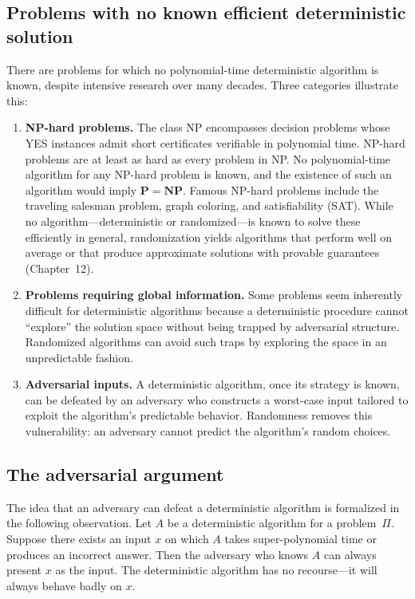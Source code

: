 \documentclass[twoside,12pt]{book}
\theoremstyle{plain}
\theoremstyle{definition}
\theoremstyle{remark}
\begin{document}
\subsection{Problems with no known efficient deterministic solution}

There are problems for which no polynomial-time deterministic algorithm is
known, despite intensive research over many decades. Three categories
illustrate this:

\begin{enumerate}
\item \textbf{NP-hard problems.} The class NP encompasses decision problems
whose YES instances admit short certificates verifiable in polynomial time.
NP-hard problems are at least as hard as every problem in NP. No
polynomial-time algorithm for any NP-hard problem is known, and the
existence of such an algorithm would imply $\mathbf{P} = \mathbf{NP}$.
Famous NP-hard problems include the traveling salesman problem, graph
coloring, and satisfiability (SAT). While no algorithm---deterministic or
randomized---is known to solve these efficiently in general, randomization
yields algorithms that perform well on average or that produce approximate
solutions with provable guarantees (Chapter~12).

\item \textbf{Problems requiring global information.} Some problems seem
inherently difficult for deterministic algorithms because a deterministic
procedure cannot ``explore'' the solution space without being trapped by
adversarial structure. Randomized algorithms can avoid such traps by
exploring the space in an unpredictable fashion.

\item \textbf{Adversarial inputs.} A deterministic algorithm, once its
strategy is known, can be defeated by an adversary who constructs a
worst-case input tailored to exploit the algorithm's predictable behavior.
Randomness removes this vulnerability: an adversary cannot predict the
algorithm's random choices.
\end{enumerate}

\subsection{The adversarial argument}

The idea that an adversary can defeat a deterministic algorithm is
formalized in the following observation. Let $A$ be a deterministic
algorithm for a problem~$\Pi$. Suppose there exists an input $x$ on which
$A$ takes super-polynomial time or produces an incorrect answer. Then the
adversary who knows $A$ can always present $x$ as the input. The
deterministic algorithm has no recourse---it will always behave badly on
$x$.
\end{document}
